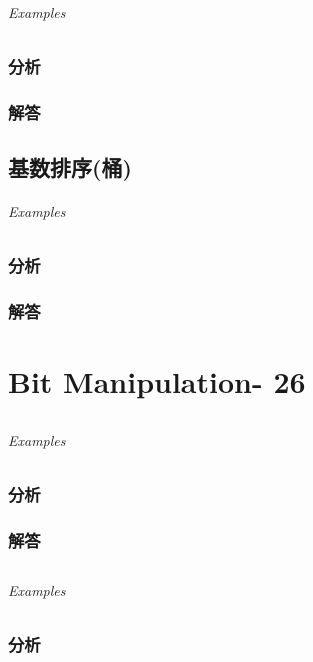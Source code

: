 \documentclass[UTF8,a4paper,12pt]{ctexbook}
\begin{document}
	\subparagraph{Examples}
	
	\subsection{分析}
	
	\subsection{解答}
	
\section{基数排序(桶)}
	
	\subparagraph{Examples}
	
	\subsection{分析}
	
	\subsection{解答}
	
	
\chapter{Bit Manipulation- 26}
\section{}
	
	\subparagraph{Examples}
	
	\subsection{分析}
	
	\subsection{解答}
	
\section{}
	
	\subparagraph{Examples}
	
	\subsection{分析}
	
\end{document}
